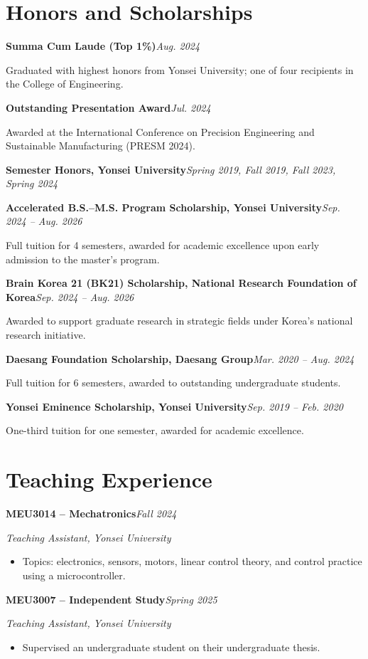 \documentclass[10pt,letterpaper]{article}
\newcommand{\entry}[4]{\textbf{#1}\hfill\textit{#2}\par\nopagebreak\textit{#3}\hfill{#4}\par\nopagebreak}
\newcommand{\entryline}[2]{\textbf{#1}\hfill\textit{#2}\par\nopagebreak}
\newcommand{\entrygap}{\vspace{3pt}}
\begin{document}
\section{Honors and Scholarships}
\entryline{Summa Cum Laude (Top 1\%)}{Aug. 2024}
Graduated with highest honors from Yonsei University; one of four recipients in the College of Engineering.\par
\entrygap
\entryline{Outstanding Presentation Award}{Jul. 2024}
Awarded at the International Conference on Precision Engineering and Sustainable Manufacturing (PRESM 2024).\par
\entrygap
\entryline{Semester Honors, Yonsei University}{Spring 2019, Fall 2019, Fall 2023, Spring 2024}
\entrygap
\entryline{Accelerated B.S.--M.S. Program Scholarship, Yonsei University}{Sep. 2024 -- Aug. 2026}
Full tuition for 4 semesters, awarded for academic excellence upon early admission to the master's program.\par
\entrygap
\entryline{Brain Korea 21 (BK21) Scholarship, National Research Foundation of Korea}{Sep. 2024 -- Aug. 2026}
Awarded to support graduate research in strategic fields under Korea's national research initiative.\par
\entrygap
\entryline{Daesang Foundation Scholarship, Daesang Group}{Mar. 2020 -- Aug. 2024}
Full tuition for 6 semesters, awarded to outstanding undergraduate students.\par
\entrygap
\entryline{Yonsei Eminence Scholarship, Yonsei University}{Sep. 2019 -- Feb. 2020}
One-third tuition for one semester, awarded for academic excellence.\par

\section{Teaching Experience}
\entry{MEU3014 -- Mechatronics}{Fall 2024}{Teaching Assistant, Yonsei University}{}
\begin{itemize}
  \item Topics: electronics, sensors, motors, linear control theory, and control practice using a microcontroller.
\end{itemize}
\entrygap
\entry{MEU3007 -- Independent Study}{Spring 2025}{Teaching Assistant, Yonsei University}{}
\begin{itemize}
  \item Supervised an undergraduate student on their undergraduate thesis.
\end{itemize}
\end{document}
